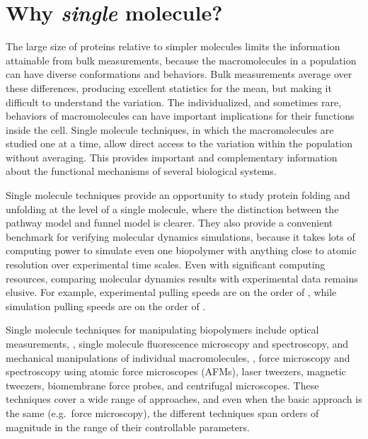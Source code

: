 \section{Why \emph{single} molecule?}
\label{sec:single-molecule}

The large size of proteins relative to simpler molecules limits the
information attainable from bulk measurements, because the
macromolecules in a population can have diverse conformations and
behaviors.  Bulk measurements average over these differences,
producing excellent statistics for the mean, but making it difficult
to understand the variation.  The individualized, and sometimes rare,
behaviors of macromolecules can have important implications for their
functions inside the cell.  Single molecule techniques, in which the
macromolecules are studied one at a time, allow direct access to the
variation within the population without averaging.  This provides
important and complementary information about the functional
mechanisms of several biological systems\citep{bustamante08}.

Single molecule techniques provide an opportunity to study protein
folding and unfolding at the level of a single molecule, where the
distinction between the pathway model and funnel model is clearer.
They also provide a convenient benchmark for verifying molecular
dynamics simulations, because it takes lots of computing power to
simulate even one biopolymer with anything close to atomic resolution
over experimental time scales.  Even with significant computing
resources, comparing molecular dynamics results with experimental data
remains elusive.  For example, experimental pulling speeds are on the
order of , while simulation pulling speeds are on the
order of \citep{lu98,lu99,rief02,zhao06,berkemeier11}.

Single molecule techniques for manipulating biopolymers include
optical measurements, \ie, single molecule fluorescence microscopy and
spectroscopy, and mechanical manipulations of individual
macromolecules, \ie, force microscopy and spectroscopy using atomic
force microscopes (AFMs), laser tweezers\citep{kellermayer97,forde02},
magnetic tweezers\citep{smith92}, biomembrane force
probes\citep{merkel99}, and centrifugal
microscopes\citep{halvorsen09}.  These techniques cover a wide range
of approaches, and even when the basic approach is the same
(e.g.\ force microscopy), the different techniques span orders of
magnitude in the range of their controllable parameters.
%

